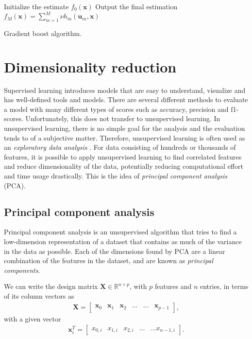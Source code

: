 \begin{algorithm}[H]
\SetAlgoLined
  Initialize the estimate $f_0(\textbf{x})$\;
 Output the final estimation $f_M(\textbf{x}) = \sum_{m=1}^M \nu h_m (\textbf{u}_m, \textbf{x})$
 \caption{Gradient boost algorithm.}
 \label{alg:gradientBoost}
\end{algorithm}

\section{Dimensionality reduction}

Supervised learning introduces models that are easy to understand, visualize and has well-defined tools and models. There are several different methods to evaluate a model with many different types of scores such as accuracy, precision and f1-scores. Unfortunately, this does not transfer to unsupervised learning. In unsupervised learning, there is no simple goal for the analysis and the evaluation tends to of a subjective matter. Therefore, unsupervised learning is often used as an \textit{exploratory data analysis} \cite{James2017}. For data consisting of hundreds or thousands of features, it is possible to apply unsupervised learning to find correlated features and reduce dimensionality of the data, potentially reducing computational effort and time usage drastically. This is the idea of \textit{principal component analysis} (PCA).

\subsection{Principal component analysis}

Principal component analysis is an unsupervised algorithm that tries to find a low-dimension representation of a dataset that contains as much of the variance in the data as possible. Each of the dimensions found by PCA are a linear combination of the features in the dataset, and are known as \textit{principal components}.

We can write the design matrix $\boldsymbol{X}\in {\mathbb{R}}^{n\times p}$, with $p$ features and $n$ entries, in terms of its column vectors as
\begin{align}
\boldsymbol{X}=\begin{bmatrix} \boldsymbol{x}_0 & \boldsymbol{x}_1 & \boldsymbol{x}_2 & \dots & \dots & \boldsymbol{x}_{p-1}\end{bmatrix},
\end{align}
with a given vector
\begin{align}
\boldsymbol{x}_i^T = \begin{bmatrix}x_{0,i} & x_{1,i} & x_{2,i}& \dots & \dots x_{n-1,i}\end{bmatrix}.
\label{eq:pc}
\end{align}

